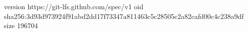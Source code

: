 version https://git-lfs.github.com/spec/v1
oid sha256:3d93d973924f91abd2dd17f73347a811463c5c28505c2a82cafd00c4c238a9df
size 196704

